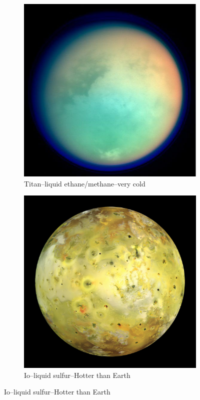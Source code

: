 \documentclass[]{article}
\begin{document}
\begin{figure}[H]
	\caption{No water? Non-polar solvents}\label{fig:non:polar}
	\begin{subfigure}[t]{0.5\textwidth}
		\caption{Titan--liquid ethane/methane--very cold}
		\includegraphics[width=\textwidth]{Titan}
	\end{subfigure}
	\begin{subfigure}[t]{0.5\textwidth}
		\caption{Io--liquid sulfur--Hotter than Earth}
		\includegraphics[width=\textwidth]{Io}
	\end{subfigure}
\end{figure}
\end{document}
